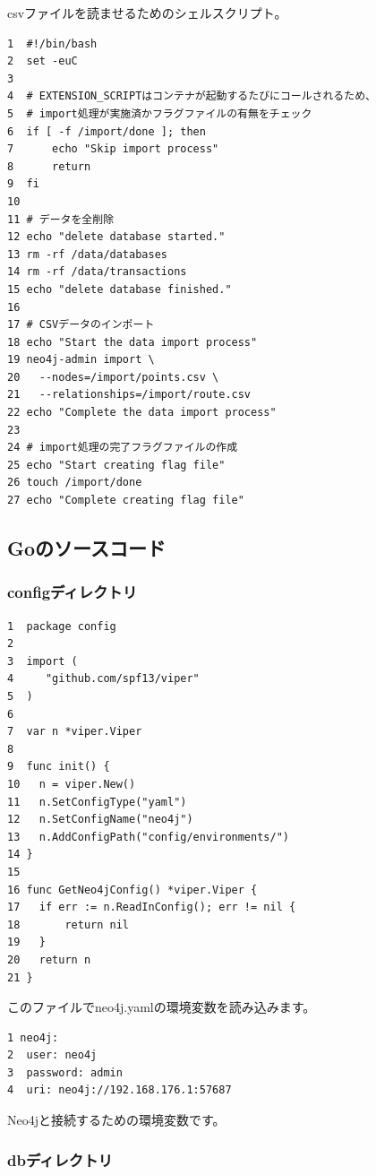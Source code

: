 csvファイルを読ませるためのシェルスクリプト。
\begin{tcolorbox}[title=import\_data.sh]
\begin{verbatim}
1  #!/bin/bash
2  set -euC
3
4  # EXTENSION_SCRIPTはコンテナが起動するたびにコールされるため、
5  # import処理が実施済かフラグファイルの有無をチェック
6  if [ -f /import/done ]; then
7      echo "Skip import process"
8      return
9  fi
10
11 # データを全削除
12 echo "delete database started."
13 rm -rf /data/databases
14 rm -rf /data/transactions
15 echo "delete database finished."
16
17 # CSVデータのインポート
18 echo "Start the data import process"
19 neo4j-admin import \
20   --nodes=/import/points.csv \
21   --relationships=/import/route.csv
22 echo "Complete the data import process"
23
24 # import処理の完了フラグファイルの作成
25 echo "Start creating flag file"
26 touch /import/done
27 echo "Complete creating flag file"
\end{verbatim}
\end{tcolorbox}
    
\subsection{Goのソースコード}
\subsubsection{configディレクトリ}

\begin{tcolorbox}[title=config.go]
\begin{verbatim}
1  package config
2
3  import (
4  	  "github.com/spf13/viper"
5  )
6
7  var n *viper.Viper
8
9  func init() {
10 	 n = viper.New()
11	 n.SetConfigType("yaml")
12 	 n.SetConfigName("neo4j")
13 	 n.AddConfigPath("config/environments/")
14 }
15
16 func GetNeo4jConfig() *viper.Viper {
17	 if err := n.ReadInConfig(); err != nil {
18		 return nil
19	 }
20	 return n
21 }
\end{verbatim}
\end{tcolorbox}
このファイルでneo4j.yamlの環境変数を読み込みます。
\begin{tcolorbox}[title=neo4j.yml]
\begin{verbatim}
1 neo4j:
2  user: neo4j
3  password: admin
4  uri: neo4j://192.168.176.1:57687
\end{verbatim}
\end{tcolorbox}
Neo4jと接続するための環境変数です。

\subsubsection{dbディレクトリ}





